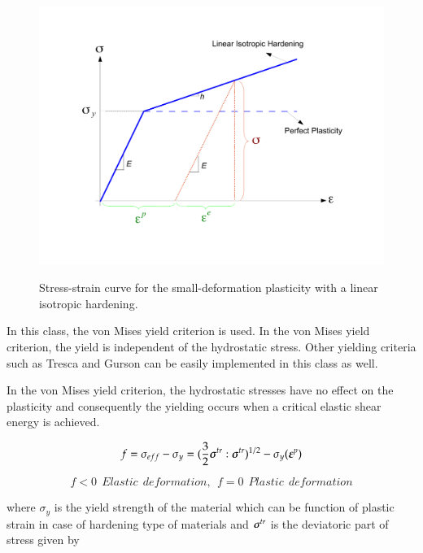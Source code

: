 \noindent 
\begin{figure}[htp]
  \centering
   {\includegraphics[scale=0.4, clip]{figures/isotropic_hardening_plasticity.pdf}}
   \caption{
    Stress-strain curve for the small-deformation plasticity with a linear isotropic hardening.
   }
  \label{fig:Lin-strain-hard}
\end{figure}

\noindent In this class, the von Mises yield criterion is used. In the von Mises yield criterion, the yield is independent of the hydrostatic stress. Other yielding criteria such as Tresca and Gurson can be easily implemented in this class as well.

In the von Mises yield criterion, the hydrostatic stresses have no effect on the plasticity and consequently the yielding occurs when a critical elastic shear energy is achieved.

\begin{equation} \label{von Mises}
	f = \sigma_{eff} - \sigma_y = (\frac{3}{2} {\boldsymbol{\sigma}}^{tr} : {\boldsymbol{\sigma}}^{tr})^{1/2}-\sigma_y (\boldsymbol{\varepsilon}^p)
\end{equation}

\begin{equation} \label{Hooks law}
 	f < 0 \   \  Elastic \  \ deformation, \                                   \
	f = 0 \   \  Plastic \  \ deformation
\end{equation}

where $\sigma_y$ is the yield strength of the material which can be function of plastic strain in case of hardening type of materials and ${\boldsymbol{\sigma}}^{tr}$ is the deviatoric part of stress given by

